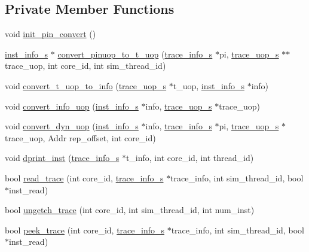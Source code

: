 \subsection*{Private Member Functions}
\begin{DoxyCompactItemize}
\item 
void \hyperlink{classtrace__read__c_a3a85825f5248721194c5b94535146459}{init\_\-pin\_\-convert} ()
\item 
\hyperlink{classinst__info__s}{inst\_\-info\_\-s} $\ast$ \hyperlink{classtrace__read__c_ae9df5fd9d3fcad53f061f93bfb6c5c7d}{convert\_\-pinuop\_\-to\_\-t\_\-uop} (\hyperlink{structtrace__info__s}{trace\_\-info\_\-s} $\ast$pi, \hyperlink{structtrace__uop__s}{trace\_\-uop\_\-s} $\ast$$\ast$trace\_\-uop, int core\_\-id, int sim\_\-thread\_\-id)
\item 
void \hyperlink{classtrace__read__c_a32c8483c87d146d86ac4f9dc3074e03b}{convert\_\-t\_\-uop\_\-to\_\-info} (\hyperlink{structtrace__uop__s}{trace\_\-uop\_\-s} $\ast$t\_\-uop, \hyperlink{classinst__info__s}{inst\_\-info\_\-s} $\ast$info)
\item 
void \hyperlink{classtrace__read__c_ae63f967e03e75fe66268da01b731ac43}{convert\_\-info\_\-uop} (\hyperlink{classinst__info__s}{inst\_\-info\_\-s} $\ast$info, \hyperlink{structtrace__uop__s}{trace\_\-uop\_\-s} $\ast$trace\_\-uop)
\item 
void \hyperlink{classtrace__read__c_af639d4cd3a4fb4970fccdc48d577ea58}{convert\_\-dyn\_\-uop} (\hyperlink{classinst__info__s}{inst\_\-info\_\-s} $\ast$info, \hyperlink{structtrace__info__s}{trace\_\-info\_\-s} $\ast$pi, \hyperlink{structtrace__uop__s}{trace\_\-uop\_\-s} $\ast$trace\_\-uop, Addr rep\_\-offset, int core\_\-id)
\item 
void \hyperlink{classtrace__read__c_a4c8ae23acf255d1fa06b6da7cd67f4ae}{dprint\_\-inst} (\hyperlink{structtrace__info__s}{trace\_\-info\_\-s} $\ast$t\_\-info, int core\_\-id, int thread\_\-id)
\item 
bool \hyperlink{classtrace__read__c_a03c129b83858f7687afb067160fc2f38}{read\_\-trace} (int core\_\-id, \hyperlink{structtrace__info__s}{trace\_\-info\_\-s} $\ast$trace\_\-info, int sim\_\-thread\_\-id, bool $\ast$inst\_\-read)
\item 
bool \hyperlink{classtrace__read__c_a15c95901d6feaf0a968aad03858eef4c}{ungetch\_\-trace} (int core\_\-id, int sim\_\-thread\_\-id, int num\_\-inst)
\item 
bool \hyperlink{classtrace__read__c_a8f641d8f18e9c7a2be45e500f6f5cec8}{peek\_\-trace} (int core\_\-id, \hyperlink{structtrace__info__s}{trace\_\-info\_\-s} $\ast$trace\_\-info, int sim\_\-thread\_\-id, bool $\ast$inst\_\-read)
\end{DoxyCompactItemize}
